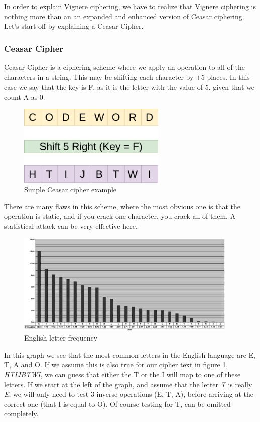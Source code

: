 \documentclass{article}
\begin{document}
In order to explain Vignere ciphering, we have to realize that Vignere ciphering is nothing more than an an expanded and enhanced version of Ceasar ciphering. Let's start off by explaining a Ceasar Cipher. 

\subsubsection{Ceasar Cipher}

Ceasar Cipher is a ciphering scheme where we apply an operation to all of the characters in a string. This may be shifting each character by +5 places. In this case we say that the key is F, as it is the letter with the value of 5, given that we count A as 0.

\begin{figure}[H]
 \centering
  \includegraphics[width=200pt]{img/ceasar.png}
 \caption{Simple Ceasar cipher example}
 \end{figure}

There are many flaws in this scheme, where the most obvious one is that the operation is static, and if you crack one character, you crack all of them. A statistical attack can be very effective here.

\begin{figure}[H]
 \centering
  \includegraphics[width=300pt]{img/frequency.jpg}
 \caption{English letter frequency\cite{LETTER}}
 \end{figure}

In this graph we see that the most common letters in the English language are E, T, A and O. If we assume this is also true for our cipher text in figure 1, \textit{HTIJBTWI}, we can guess that either the T or the I will map to one of these letters. If we start at the left of the graph, and assume that the letter \textit{T} is really \textit{E}, we will only need to test 3 inverse operations (E, T, A), before arriving at the correct one (that I is equal to O). Of course testing for T, can be omitted completely.
\end{document}
